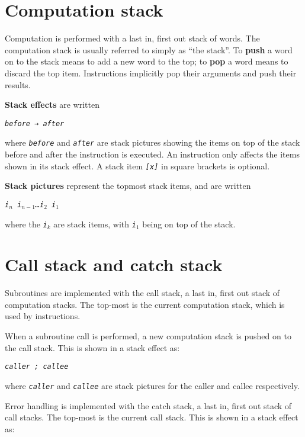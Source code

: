 \documentclass[a4paper]{article}
\newcommand{\spic}[1]{\texttt{\textsl{#1\/}}}
\begin{document}
\section{Computation stack}

Computation is performed with a last in, first out stack of words. The computation stack is usually referred to simply as “the stack”. To {\bf push} a word on to the stack means to add a new word to the top; to {\bf pop} a word means to discard the top item. Instructions implicitly pop their arguments and push their results.

{\bf Stack effects} are written

\begin{center}
  {\tt \spic{before → after}}
\end{center}

\noindent where \spic{before} and \spic{after} are stack pictures showing the items on top of the stack before and after the instruction is executed. An instruction only affects the items shown in its stack effect. A stack item \spic{[x]} in square brackets is optional.

{\bf Stack pictures}
represent the topmost stack items, and are written

\begin{center}
\spic{i$_n$ i$_{n-1}$\dots i$_2$ i$_1$}
\end{center}

\noindent where the \spic{i$_k$} are stack items, with \spic{i$_1$} being on top of the stack.


\section{Call stack and catch stack}
\label{callstack}

Subroutines are implemented with the call stack, a last in, first out stack of computation stacks. The top-most is the current computation stack, which is used by instructions.

When a subroutine call is performed, a new computation stack is pushed on to the call stack. This is shown in a stack effect as:

\begin{center}
  {\tt \spic{caller ; callee}}
\end{center}

\noindent where \spic{caller} and \spic{callee} are stack pictures for the caller and callee respectively.

Error handling is implemented with the catch stack, a last in, first out stack of call stacks. The top-most is the current call stack. This is shown in a stack effect as:
\end{document}
